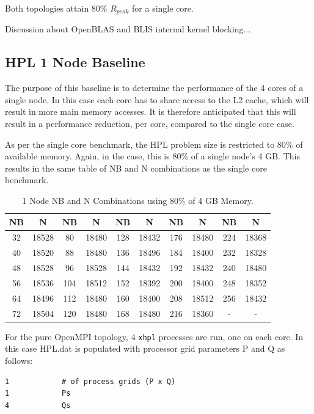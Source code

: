 \documentclass{report}
\begin{document}
Both topologies attain 80\% $R_{peak}$ for a single core.

Discussion about OpenBLAS and BLIS internal kernel blocking...


%
%
\subsection{HPL 1 Node Baseline}

The purpose of this baseline is to determine the performance of the 4 cores of a single node. In this case each core has to share access to the L2 cache, which will result in more main memory accesses. It is therefore anticipated that this will result in a performance reduction, per core, compared to the single core case.

As per the single core benchmark, the HPL problem size is restricted to 80\% of available memory. Again, in the case, this is 80\% of a single node's 4 GB. This results in the same table of NB and N combinations as the single core benchmark.

\begin{table}[H]
\begin{center}
	\begin{tabular}{ |c|c|c|c|c|c|c|c|c|c| } 
		\hline
		NB & N & NB & N & NB & N & NB & N & NB & N \\ 
		\hline
		32 & 18528 &  80 & 18480 & 128 & 18432 & 176 & 18480 & 224 & 18368 \\ 
		40 & 18520 &  88 & 18480 & 136 & 18496 & 184 & 18400 & 232 & 18328 \\ 
 		48 & 18528 &  96 & 18528 & 144 & 18432 & 192 & 18432 & 240 & 18480 \\
		56 & 18536 & 104 & 18512 & 152 & 18392 & 200 & 18400 & 248 & 18352 \\ 
 		64 & 18496 & 112 & 18480 & 160 & 18400 & 208 & 18512 & 256 & 18432 \\
		72 & 18504 & 120 & 18480 & 168 & 18480 & 216 & 18360 &   - &     - \\ 
 		\hline
	\end{tabular}
\end{center}
\caption{\label{tab:table-name}1 Node NB and N Combinations using 80\% of 4 GB Memory.}
\end{table}

For the pure OpenMPI topology, 4 \verb|xhpl| processes are run, one on each core. In this case HPL.dat is populated with processor grid parameters P and Q as follows:

\lstset{style=listing}
\begin{lstlisting}[numbers=none]
1            # of process grids (P x Q)
1            Ps
4            Qs
\end{lstlisting}
\end{document}
